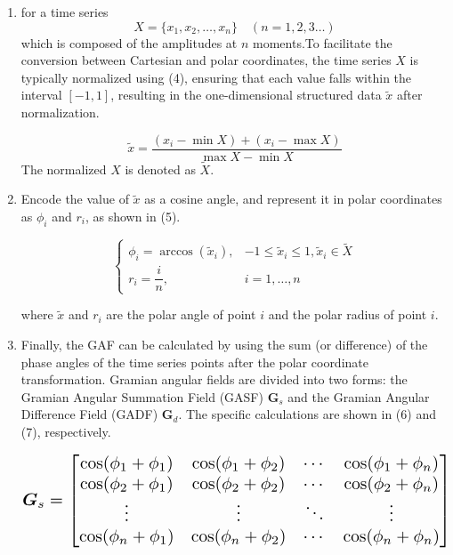 \documentclass[final,5p,times,twocolumn]{elsarticle}
\begin{document}
\begin{enumerate}
	\item{for a time series}
	\begin{equation}
		X = \{x_1, x_2, \ldots, x_n\} \quad (n = 1, 2, 3\ldots)
	\end{equation}
	which is composed of the amplitudes at \(n\) moments.To facilitate the conversion between Cartesian and polar coordinates, the time series \(X\) is typically normalized using (4), ensuring that each value falls within the interval \([-1,1]\), resulting in the one-dimensional structured data \(\tilde{x}\) after normalization.
	
	\begin{equation}
		\tilde{x} = \frac{(x_i - \min X) + (x_i - \max X)}{\max X - \min X}
	\end{equation}
	\noindent The normalized \(X\) is denoted as \(\tilde {X}\).
	
	
	\item{Encode the value of \(\tilde{x}\) as a cosine angle, and represent it in polar coordinates as \(\phi_i\)} and \(r_i\), as shown in (5).
	
	\begin{equation}
		\begin{cases} 
			\phi_i = \arccos(\tilde{x}_i), & -1 \leq \tilde{x}_i \leq 1, \tilde{x}_i \in \tilde{X} \\
			r_i = \dfrac{i}{n}, & i = 1, \ldots, n 
		\end{cases}
	\end{equation}
	
	\noindent where \(\tilde{x}\) and \(r_i\) are the polar angle of point \(i\) and the polar radius of point \(i\).
	
	\item{Finally, the GAF can be calculated by using the sum (or difference) of the phase angles of the time series points after the polar coordinate transformation. Gramian angular fields are divided into two forms: the Gramian Angular Summation Field (GASF) \(\boldsymbol{G}_s\) and the Gramian Angular Difference Field (GADF) \(\boldsymbol{G}_d\). The specific calculations are shown in (6) and (7), respectively.

		\begin{equation}
			\resizebox{\linewidth}{!}{$
				\boldsymbol{G}_s = \begin{bmatrix}
					\cos(\phi_1 + \phi_1) & \cos(\phi_1 + \phi_2) & \cdots & \cos(\phi_1 + \phi_n) \\
					\cos(\phi_2 + \phi_1) & \cos(\phi_2 + \phi_2) & \cdots & \cos(\phi_2 + \phi_n) \\
					\vdots & \vdots & \ddots & \vdots \\
					\cos(\phi_n + \phi_1) & \cos(\phi_n + \phi_2) & \cdots & \cos(\phi_n + \phi_n)
				\end{bmatrix}
				$}
		\end{equation}
		
}
\end{enumerate}
\end{document}
